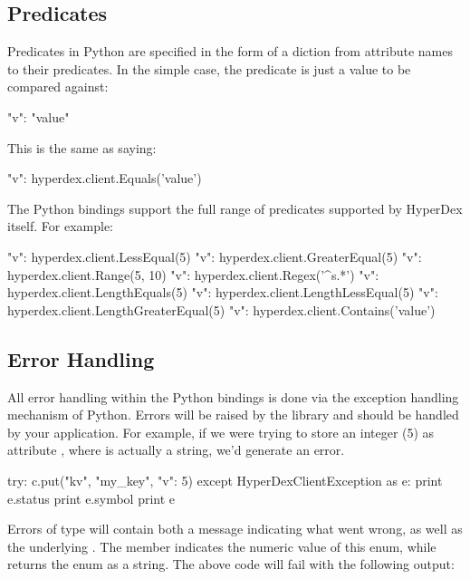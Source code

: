 \subsection{Predicates}
\label{sec:api:python-client:predicates}

Predicates in Python are specified in the form of a diction from attribute names to
their predicates.  In the simple case, the predicate is just a value to be
compared against:

\begin{pythoncode}
{"v": "value"}
\end{pythoncode}

This is the same as saying:

\begin{pythoncode}
{"v": hyperdex.client.Equals('value')}
\end{pythoncode}

The Python bindings support the full range of predicates supported by HyperDex
itself.  For example:

\begin{pythoncode}
{"v": hyperdex.client.LessEqual(5)}
{"v": hyperdex.client.GreaterEqual(5)}
{"v": hyperdex.client.Range(5, 10)}
{"v": hyperdex.client.Regex('^s.*')}
{"v": hyperdex.client.LengthEquals(5)}
{"v": hyperdex.client.LengthLessEqual(5)}
{"v": hyperdex.client.LengthGreaterEqual(5)}
{"v": hyperdex.client.Contains('value')}
\end{pythoncode}

\subsection{Error Handling}
\label{sec:api:python-client:error-handling}

All error handling within the Python bindings is done via the exception handling
mechanism of Python.  Errors will be raised by the library and should be handled
by your application.  For example, if we were trying to store an integer (5) as
attribute , where  is actually a string, we'd generate an error.

\begin{pythoncode}
try:
    c.put("kv", "my_key", {"v": 5})
except HyperDexClientException as e:
    print e.status
    print e.symbol
    print e
\end{pythoncode}

Errors of type  will contain both a message
indicating what went wrong, as well as the underlying .  The member  indicates the numeric
value of this enum, while  returns the enum as a string.  The above
code will fail with the following output:

